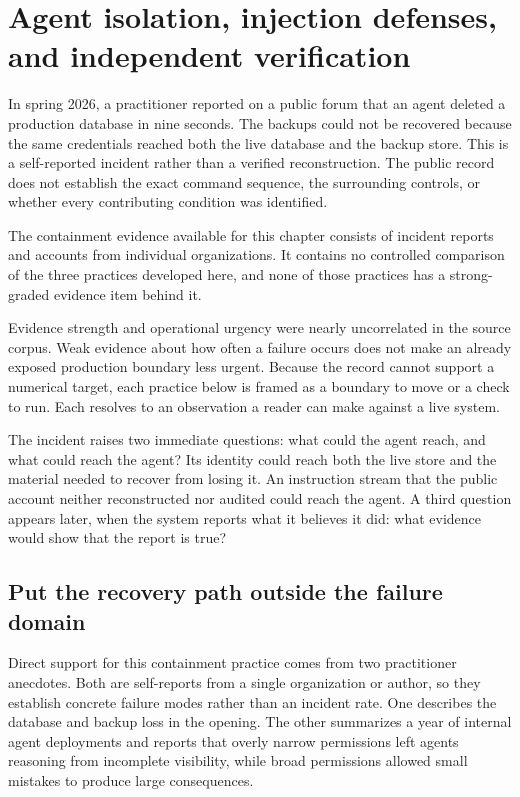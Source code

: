 \chapter{Agent isolation, injection defenses, and independent verification}
\label{ch07-isolation-injection-independent-verification}
In spring 2026, a practitioner reported on a public forum that an agent deleted a production database in nine seconds. The backups could not be recovered because the same credentials reached both the live database and the backup store. This is a self-reported incident rather than a verified reconstruction. The public record does not establish the exact command sequence, the surrounding controls, or whether every contributing condition was identified.

The containment evidence available for this chapter consists of incident reports and accounts from individual organizations. It contains no controlled comparison of the three practices developed here, and none of those practices has a strong-graded evidence item behind it.

Evidence strength and operational urgency were nearly uncorrelated in the source corpus. Weak evidence about how often a failure occurs does not make an already exposed production boundary less urgent. Because the record cannot support a numerical target, each practice below is framed as a boundary to move or a check to run. Each resolves to an observation a reader can make against a live system.

The incident raises two immediate questions: what could the agent reach, and what could reach the agent? Its identity could reach both the live store and the material needed to recover from losing it. An instruction stream that the public account neither reconstructed nor audited could reach the agent. A third question appears later, when the system reports what it believes it did: what evidence would show that the report is true?

\section{Put the recovery path outside the failure domain}\label{put-the-recovery-path-outside-the-failure-domain}

Direct support for this containment practice comes from two practitioner anecdotes. Both are self-reports from a single organization or author, so they establish concrete failure modes rather than an incident rate. One describes the database and backup loss in the opening. The other summarizes a year of internal agent deployments and reports that overly narrow permissions left agents reasoning from incomplete visibility, while broad permissions allowed small mistakes to produce large consequences.

